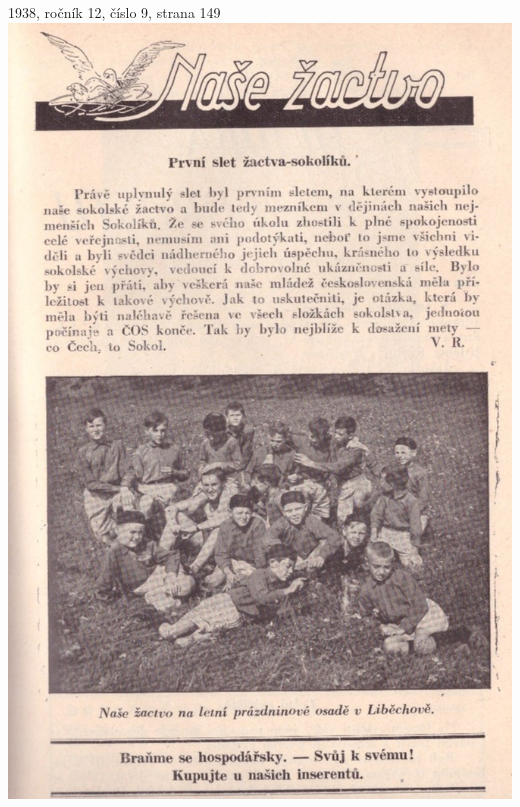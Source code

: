 \documentclass[11pt]{article}
\begin{document}
1938, ročník 12, číslo 9, strana 149 \\
\includegraphics[width=\imagewidth]{original/1938/Skener_20250318 (8).jpg}



\clearpage
\end{document}
